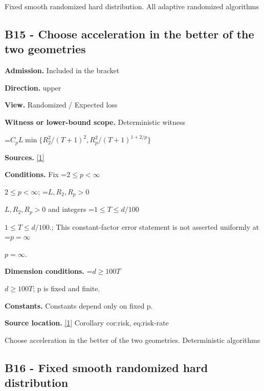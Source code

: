 \documentclass[10pt,a4paper]{article}
\newcommand{\AtlasMath}[1]{\par\begingroup\centering\setbox0=\hbox{$\displaystyle #1$}\ifdim\wd0>1.4\linewidth\typeout{ATLAS WIDE FORMULA: \the\wd0}\fi\ifdim\wd0>\linewidth\resizebox{\linewidth}{!}{\box0}\else\box0\fi\par\endgroup}
\newcommand{\AtlasInlineMath}[1]{\begingroup\setbox0=\hbox{$#1$}\ifdim\wd0>.4\linewidth\endgroup\AtlasMath{#1}\else\endgroup$#1$\fi}
\begin{document}
Fixed smooth randomized hard distribution. All adaptive randomized algorithms



\subsection{B15 - Choose acceleration in the better of the two geometries}


\textbf{Admission.} Included in the bracket



\textbf{Direction.} upper



\textbf{View.} Randomized / Expected loss



\textbf{Witness or lower-bound scope.} Deterministic witness



\AtlasMath{C_pL\min\{R_2^2/(T+1)^2,R_p^2/(T+1)^{1+2/p}\}}


\textbf{Sources.} \href{https://github.com/WU-Wendao/Colombo/blob/main/colombo_sensorium/Complexity_altas/data/sources/colombo/U02/manuscript.pdf}{[1]}



\textbf{Conditions.} Fix \AtlasInlineMath{2\le p<\infty}; \AtlasInlineMath{L,R_2,R_p>0} and integers \AtlasInlineMath{1\le T\le d/100}.; This constant-factor error statement is not asserted uniformly at \AtlasInlineMath{p=\infty}.



\textbf{Dimension conditions.} \AtlasInlineMath{d\ge100T}; p is fixed and finite.



\textbf{Constants.} Constants depend only on fixed p.



\textbf{Source location.} \href{https://github.com/WU-Wendao/Colombo/blob/main/colombo_sensorium/Complexity_altas/data/sources/colombo/U02/manuscript.pdf}{[1]} Corollary cor:risk, eq:risk-rate



Choose acceleration in the better of the two geometries. Deterministic algorithms



\subsection{B16 - Fixed smooth randomized hard distribution}
\end{document}

